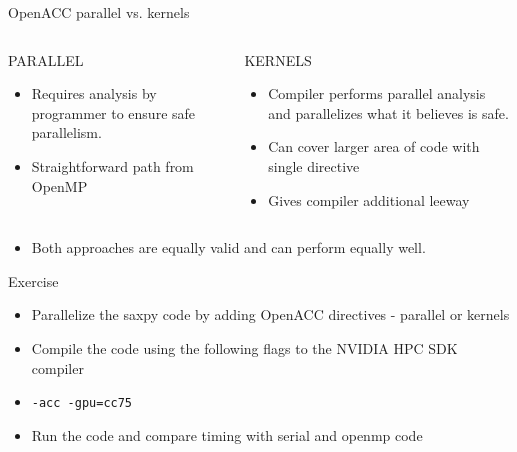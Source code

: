 \documentclass[10pt,t]{beamer}
\begin{document}
\begin{frame}{ OpenACC parallel vs. kernels}
  \begin{columns}
    \begin{block}{PARALLEL}
      \begin{itemize}
        \item Requires analysis by programmer to ensure safe parallelism.
        \item Straightforward path from OpenMP
      \end{itemize}
    \end{block}
    \begin{block}{KERNELS}
      \begin{itemize}
        \item Compiler performs parallel analysis and parallelizes what it believes is safe.
        \item Can cover larger area of code with single directive
        \item Gives compiler additional leeway
      \end{itemize}
    \end{block}
  \end{columns}
  \begin{itemize}
    \item[] Both approaches are equally valid and can perform equally well.
  \end{itemize}
\end{frame}

\begin{frame}[fragile]{Exercise}
  \begin{itemize}
    \item Parallelize the saxpy code by adding OpenACC directives - parallel or kernels
    \item Compile the code using the following flags to the NVIDIA HPC SDK compiler
    \item[] \lstinline[basicstyle=\normalsize\ttfamily]|-acc -gpu=cc75|
    \item Run the code and compare timing with serial and openmp code
  \end{itemize}
\end{frame}
\end{document}

